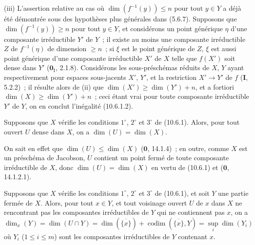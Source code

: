 (iii) L'assertion relative au cas où $\dim(f^{-1}(y))\leq n$ pour tout $y\in Y$
a déjà été démontrée sous des hypothèses plus générales dans (5.6.7). Supposons
que $\dim(f^{-1}(y))\geq n$ pour tout $y\in Y$, et considérons un point générique
$\eta$ d'une composante irréductible $Y'$ de $Y$~; il existe au moins une
composante irréductible $Z$ de $f^{-1}(\eta)$ de dimension $\geq n$~; si $\xi$
est le point générique de $Z$, $\xi$ est aussi point générique d'une composante
irréductible $X'$ de $X$ telle que $f(X')$ soit dense dans $Y'$ ($\mathbf 0_{\mathrm I}$,
2.1.8). Considérons les sous-préschémas réduits de $X$, $Y$ ayant respectivement
pour espaces sous-jacents $X'$, $Y'$, et la restriction $X'\to Y'$ de $f$
(\textbf{I}, 5.2.2)~; il résulte alors de (ii) que
$\dim(X')\geq\dim(Y')+n$, et a fortiori $\dim(X)\geq\dim(Y')+n$~; ceci étant vrai
pour toute composante irréductible $Y'$ de $Y$, on en conclut l'inégalité
(10.6.1.2).

\begin{corollary}[10.6.2]
\label{IV.10.6.2-fr}
Supposons que $X$ vérifie les conditions $1^\circ$, $2^\circ$ et $3^\circ$ de
(10.6.1). Alors, pour tout ouvert $U$ dense dans $X$, on a
$\dim(U)=\dim(X)$.
\end{corollary}

On sait en effet que $\dim(U)\leq\dim(X)$ ($\mathbf 0$, 14.1.4)~; en outre,
comme $X$ est un préschéma de Jacobson, $U$ contient un point fermé de toute
composante irréductible de $X$, donc $\dim(U)=\dim(X)$ en vertu de (10.6.1) et
($\mathbf 0$, 14.1.2.1).

\begin{proposition}[10.6.3]
\label{IV.10.6.3-fr}
Supposons que $X$ vérifie les conditions $1^\circ$, $2^\circ$ et $3^\circ$ de
(10.6.1), et soit $Y$ une partie fermée de $X$. Alors, pour tout $x\in Y$, et
tout voisinage ouvert $U$ de $x$ dans $X$ ne rencontrant pas les composantes
irréductibles de $Y$ qui ne contiennent pas $x$, on a
\begin{equation}
\label{IV.10.6.3.1-fr}
\tag{10.6.3.1}
\dim_x(Y)=\dim(U\cap Y)=\dim(\overline{\{x\}})
 +\operatorname{codim}(\overline{\{x\}},Y)=\sup_i\dim(Y_i)
\end{equation}
où $Y_i$ ($1\leq i\leq m$) sont les composantes irréductibles de $Y$ contenant
$x$.
\end{proposition}

